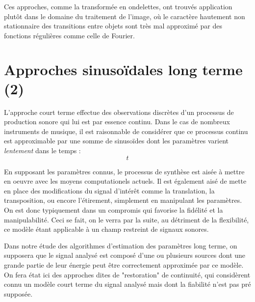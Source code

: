 Ces approches, comme la transformée en ondelettes, ont trouvés application plutôt dans le domaine du traitement de l'image, où le caractère hautement non stationnaire des transitions entre objets sont très mal approximé par des fonctions régulières comme celle de Fourier.

\section{Approches sinusoïdales long terme (2)}

\cite{mcaulay}

L'approche court terme effectue des observations discrètes d'un processus de production sonore qui lui est par essence continu. Dans le cas de nombreux instruments de musique, il est raisonnable de considérer que ce processus continu est approximable par une somme de sinusoïdes dont les paramètres varient \textsl{lentement} dans le temps :
\begin{equation}
t
\end{equation}

En supposant les paramètres connus, le processus de synthèse est aisée à mettre en oeuvre avec les moyens computationels actuels. Il est également aisé de mette en place des modifications du signal d'intérêt comme la translation, la transposition, ou encore l'étirement, simplement en manipulant les paramètres. On est donc typiquement dans un compromis qui favorise la fidélité et la manipulabilité. Ceci se fait, on le verra par la suite, au détriment de la flexibilité, ce modèle étant applicable à un champ restreint de signaux sonores.

Dans notre étude des algorithmes d'estimation des paramètres long terme, on supposera que le signal analysé est composé d'une ou plusieurs sources dont une grande partie de leur énergie peut être correctement approximée par ce modèle. On fera état ici des approches dites de "restoration" de continuité, qui considèrent connu un modèle court terme du signal analysé mais dont la fiabilité n'est pas pré supposée.


